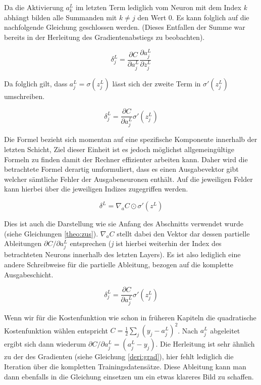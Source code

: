 Da die Aktivierung $a^L_k$ im letzten Term lediglich vom Neuron mit dem Index \emph{k} abhängt bilden alle Summanden mit $k \neq j$ den Wert 0. Es kann folglich auf die nachfolgende Gleichung geschlossen werden. (Dieses Entfallen der Summe war bereits in der Herleitung des Gradientenabstiegs zu beobachten). 

\begin{equation}
\delta^L_j = \frac{\partial C}{\partial a^L_j} \frac{\partial a^L_j}{\partial z^L_j}
\end{equation}

Da folglich gilt, dass $a^L_j = \sigma(z^L_j)$ lässt sich der zweite Term in $\sigma'(z^L_j)$ umschreiben. 

\begin{equation}
\delta^L_j = \frac{\partial C}{\partial a^L_j} \sigma'(z^L_j)
\end{equation}

Die Formel bezieht sich momentan auf eine spezifische Komponente innerhalb der letzten Schicht, Ziel dieser Einheit ist es jedoch möglichst allgemeingültige Formeln zu finden damit der Rechner effizienter arbeiten kann. Daher wird die betrachtete Formel derartig umformuliert, dass es einen Ausgabevektor gibt welcher sämtliche Fehler der Ausgabeneuronen enthält. Auf die jeweiligen Felder kann hierbei über die jeweiligen Indizes zugegriffen werden. 

\begin{equation}
\delta^L = \nabla_a C \odot \sigma'(z^L)
\end{equation}

Dies ist auch die Darstellung wie sie Anfang des Abschnitts verwendet wurde (siehe Gleichungen \ref{theo:zus}). $\nabla_a C$ stellt dabei den Vektor dar dessen partielle Ableitungen $\partial C / \partial a^L_j$ entsprechen (\emph{j} ist hierbei weiterhin der Index des betrachteten Neurons innerhalb des letzten Layers). Es ist also lediglich eine andere Schreibweise für die partielle Ableitung, bezogen auf die komplette Ausgabeschicht. 

\begin{equation}
\delta^L_j = \frac{\partial C}{\partial a^L_j} \sigma'(z^L_j)
\end{equation}


Wenn wir für die Kostenfunktion wie schon in früheren Kapiteln die quadratische Kostenfunktion wählen entspricht $C = \frac{1}{2} \sum_j (y_j-a^L_j)^2$. Nach $a^L_j$ abgeleitet ergibt sich dann wiederum $\partial C / \partial a^L_j = (a_j^L-y_j)$. Die Herleitung ist sehr ähnlich zu der des Gradienten (siehe Gleichung \ref{deri:grad}), hier fehlt lediglich die Iteration über die kompletten Trainingsdatensätze. Diese Ableitung kann man dann ebenfalls in die Gleichung einsetzen um ein etwas klareres Bild zu schaffen. 

